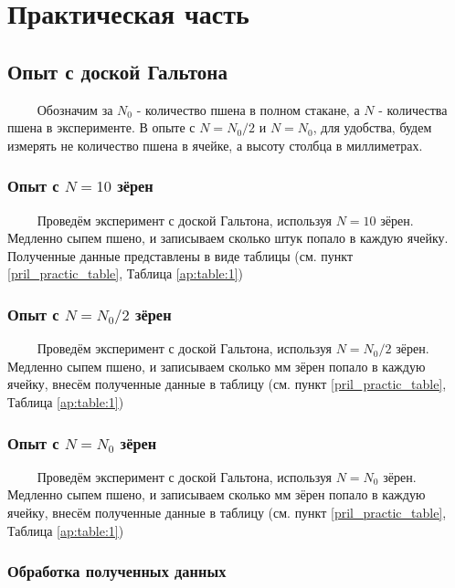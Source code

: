 \section{Практическая часть}



\subsection{Опыт с доской Гальтона}

$\qquad$ Обозначим за $N_0$ - количество пшена в полном стакане, а $N$ - количества пшена в эксперименте. В опыте с $N = N_0 / 2$ и $N = N_0$, для удобства, будем измерять не количество пшена в ячейке, а высоту столбца в миллиметрах.
	
\subsubsection{Опыт с $N = 10$ зёрен}

$\qquad$ Проведём эксперимент с доской Гальтона, используя $N = 10$ зёрен. Медленно сыпем пшено, и записываем сколько штук попало в каждую ячейку. Полученные данные представлены в виде таблицы (см. пункт \ref{pril_practic_table}, Таблица \ref{ap:table:1})

\subsubsection{Опыт с $N = N_0 / 2$ зёрен}

$\qquad$ Проведём эксперимент с доской Гальтона, используя $N = N_0 / 2$ зёрен. Медленно сыпем пшено, и записываем сколько мм зёрен попало в каждую ячейку, внесём полученные данные в таблицу (см. пункт \ref{pril_practic_table}, Таблица \ref{ap:table:1})


\subsubsection{Опыт с $N = N_0$ зёрен} 

$\qquad$ Проведём эксперимент с доской Гальтона, используя $N = N_0$ зёрен. Медленно сыпем пшено, и записываем сколько мм зёрен попало в каждую ячейку, внесём полученные данные в таблицу (см. пункт \ref{pril_practic_table}, Таблица \ref{ap:table:1})

\subsubsection{Обработка полученных данных} \label{obrabotka}

